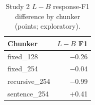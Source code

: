 \begin{table}[htbp]\centering\small
\caption{Study 2 $L-B$ response-F1 difference by chunker (points; exploratory).}\label{tab:chunkers}
\begin{tabular}{lr}\toprule
Chunker & $L-B$ F1\\\midrule
fixed\_128 & $-$0.26\\
fixed\_254 & $-$0.04\\
recursive\_254 & $-$0.99\\
sentence\_254 & $+$0.41\\
\bottomrule\end{tabular}\end{table}
